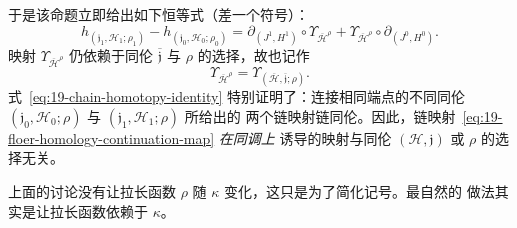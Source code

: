 于是该命题立即给出如下恒等式（差一个符号）：
\begin{equation}
 h_{(\mathfrak j_1,\mathcal H_1;\rho_1)}
 -h_{(\mathfrak j_0,\mathcal H_0;\rho_0)}
 =\partial_{(J^1,H^1)}\circ\Upsilon_{\overline{\mathcal H}^{\rho}}
 +\Upsilon_{\overline{\mathcal H}^{\rho}}\circ\partial_{(J^0,H^0)}.
\label{eq:19-chain-homotopy-identity}
\end{equation}
映射 $\Upsilon_{\overline{\mathcal H}^{\rho}}$ 仍依赖于同伦
$\overline{\mathfrak j}$ 与 $\rho$ 的选择，故也记作
\[
 \Upsilon_{\overline{\mathcal H}^{\rho}}
 =\Upsilon_{(\overline{\mathcal H},\overline{\mathfrak j};\rho)}.
\]
式~\eqref{eq:19-chain-homotopy-identity} 特别证明了：连接相同端点的不同同伦
$(\mathfrak j_0,\mathcal H_0;\rho)$ 与 $(\mathfrak j_1,\mathcal H_1;\rho)$ 所给出的
两个链映射链同伦。因此，链映射~\eqref{eq:19-floer-homology-continuation-map} \emph{在同调上}
诱导的映射与同伦 $(\mathcal H,\mathfrak j)$ 或 $\rho$ 的选择无关。

\begin{remark}
\label{rem:vary-elongation-in-chain-homotopy}
上面的讨论没有让拉长函数 $\rho$ 随 $\kappa$ 变化，这只是为了简化记号。最自然的
做法其实是让拉长函数依赖于 $\kappa$。
\end{remark}
